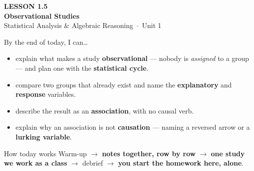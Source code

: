\documentclass[aspectratio=169, 11pt]{beamer}
\begin{document}
{
\begin{frame}[plain]
  \vspace{2.8cm}\hspace{0.55cm}%
  \begin{minipage}{0.9\textwidth}
    {\color{goldacc}\bfseries\small LESSON 1.5}\\[0.5cm]
    {\color{white}\bfseries\LARGE Observational Studies}\\[1.2cm]
    {\color{frostmid}\small Statistical Analysis \& Algebraic Reasoning~$\cdot$~Unit 1}
  \end{minipage}
\end{frame}
}

\begin{frame}[t, plain]
  By the end of today, I can\ldots
  \begin{itemize}\setlength{\itemsep}{5pt}
    \item explain what makes a study \textbf{observational} --- nobody is \emph{assigned} to a
          group --- and plan one with the \textbf{statistical cycle}.
    \item compare two groups that already exist and name the \textbf{explanatory} and
          \textbf{response} variables.
    \item describe the result as an \textbf{association}, with no causal verb.
    \item explain why an association is not \textbf{causation} --- naming a reversed arrow or a
          \textbf{lurking variable}.
  \end{itemize}
  \begin{block}{How today works}
    Warm-up $\to$ \textbf{notes together, row by row} $\to$ \textbf{one study we work as a
    class} $\to$ debrief $\to$ \textbf{you start the homework here, alone}.
  \end{block}
\end{frame}
\end{document}
